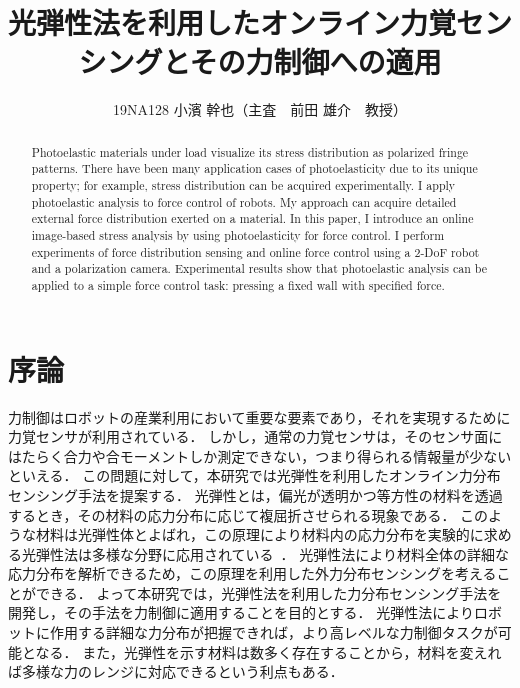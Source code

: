 \documentclass[a4paper,papersize,dvipdfmx]{mtabst}
\begin{document}
\date{}

\title{光弾性法を利用したオンライン力覚センシングとその力制御への適用}


\author{
\begin{tabular}{p{.45\linewidth}p{.45\linewidth}}
\centering 19NA128 小濱 幹也 & \centering （主査　前田 雄介　教授）
\end{tabular}
}



\begin{abstract}
  Photoelastic materials under load visualize its stress distribution as polarized fringe patterns.
  There have been many application cases of photoelasticity due to its unique property;
  for example, stress distribution can be acquired experimentally.
  I apply photoelastic analysis to force control of robots.
  My approach can acquire detailed external force distribution exerted on a material.
  In this paper, I introduce an online image-based stress analysis by using photoelasticity for force control.
  I perform experiments of force distribution sensing and online force control using a 2-DoF robot and a polarization camera.
  Experimental results show that photoelastic analysis can be applied to a simple force control task: pressing a fixed wall with specified force.
\end{abstract}

\maketitle

\section{序論}
力制御はロボットの産業利用において重要な要素であり，それを実現するために力覚センサが利用されている．
しかし，通常の力覚センサは，そのセンサ面にはたらく合力や合モーメントしか測定できない，つまり得られる情報量が少ないといえる．
この問題に対して，本研究では光弾性を利用したオンライン力分布センシング手法を提案する．
光弾性とは，偏光が透明かつ等方性の材料を透過するとき，その材料の応力分布に応じて複屈折させられる現象である．
このような材料は光弾性体とよばれ，この原理により材料内の応力分布を実験的に求める光弾性法は多様な分野に応用されている~\cite{ramesh2020}．
光弾性法により材料全体の詳細な応力分布を解析できるため，この原理を利用した外力分布センシングを考えることができる．
よって本研究では，光弾性法を利用した力分布センシング手法を開発し，その手法を力制御に適用することを目的とする．
光弾性法によりロボットに作用する詳細な力分布が把握できれば，より高レベルな力制御タスクが可能となる．
また，光弾性を示す材料は数多く存在することから，材料を変えれば多様な力のレンジに対応できるという利点もある．
\end{document}
